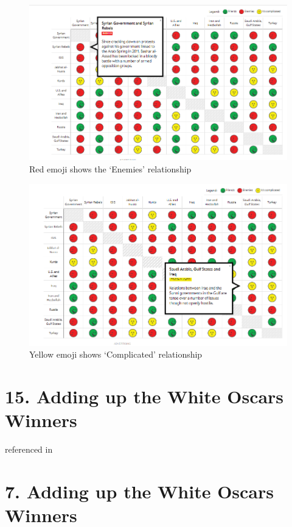 \documentclass[]{book}
\theoremstyle{definition}
\theoremstyle{definition}
\theoremstyle{definition}
\theoremstyle{remark}
\begin{document}
\begin{figure}
\centering
\includegraphics{images/img_syria_enemies.PNG}
\caption{Red emoji shows the `Enemies' relationship}
\end{figure}

\begin{figure}
\centering
\includegraphics{images/img_syria_complicated.PNG}
\caption{Yellow emoji shows `Complicated' relationship}
\end{figure}

\section{15. Adding up the White Oscars
Winners}\label{adding-up-the-white-oscars-winners}

\citep{oscars_sowhite_chart} referenced in \citep{int_viz_2}

\section{7. Adding up the White Oscars
Winners}\label{adding-up-the-white-oscars-winners-1}
\end{document}
